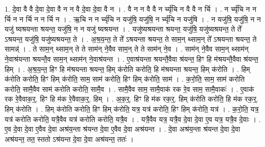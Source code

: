 \documentclass[17pt]{extarticle}
\begin{document}
1. दे॒वा वै वै दे॒वा दे॒वा वै न न वै दे॒वा दे॒वा वै न । . वै न न वै वै न र्च्यृ॑चि न वै वै न र्चि । . न र्च्यृ॑चि न न र्चि न न र्चि न न र्चि न । . ऋ॒चि न न र्च्यृ॑चि न यजु॑षि॒ यजु॑षि॒ न र्च्यृ॑चि न यजु॑षि । . न यजु॑षि॒ यजु॑षि॒ न न यजु॑ ष्यश्रयन्ता श्रयन्त॒ यजु॑षि॒ न न यजु॑ ष्यश्रयन्त । . यजु॑ष्यश्रयन्ता श्रयन्त॒ यजु॑षि॒ यजु॑ष्यश्रयन्त॒ ते ते᳚ ऽश्रयन्त॒ यजु॑षि॒ यजु॑ष्यश्रयन्त॒ ते । . अ॒श्र॒य॒न्त॒ ते ते᳚ ऽश्रयन्ता श्रयन्त॒ ते साम॒न् थ्साम॒न् ते᳚ ऽश्रयन्ता श्रयन्त॒ ते सामन्न्॑ । . ते साम॒न् थ्साम॒न् ते ते साम॑न् ने॒वैव साम॒न् ते ते साम॑न् ने॒व । . साम॑न् ने॒वैव साम॒न् थ्साम॑न् ने॒वाश्र॑यन्ता श्रयन्तै॒व साम॒न् थ्साम॑न् ने॒वाश्र॑यन्त । . ए॒वाश्र॑यन्ता श्रयन्तै॒वैवा श्र॑यन्त॒ हिꣳ हि म॑श्रयन्तै॒वैवा श्र॑यन्त॒ हिम् । . अ॒श्र॒य॒न्त॒ हिꣳ हि म॑श्रयन्ता श्रयन्त॒ हिम् क॑रोति करोति॒ हि म॑श्रयन्ता श्रयन्त॒ हिम् क॑रोति । . हिम् क॑रोति करोति॒ हिꣳ हिम् क॑रोति॒ साम॒ साम॑ करोति॒ हिꣳ हिम् क॑रोति॒ साम॑ । . क॒रो॒ति॒ साम॒ साम॑ करोति करोति॒ सामै॒वैव साम॑ करोति करोति॒ सामै॒व । . सामै॒वैव साम॒ सामै॒वाक॑ रक रे॒व साम॒ सामै॒वाकः॑ । . ए॒वाक॑ रक रे॒वैवाक॒र्॒. हिꣳ हि म॑क रे॒वैवाक॒र्॒. हिम् । . अ॒क॒र्॒. हिꣳ हि म॑क रक॒र्॒. हिम् क॑रोति करोति॒ हि म॑क रक॒र्॒. हिम् क॑रोति । . हिम् क॑रोति करोति॒ हिꣳ हिम् क॑रोति॒ यत्र॒ यत्र॑ करोति॒ हिꣳ हिम् क॑रोति॒ यत्र॑ । . क॒रो॒ति॒ यत्र॒ यत्र॑ करोति करोति॒ यत्रै॒वैव यत्र॑ करोति करोति॒ यत्रै॒व । . यत्रै॒वैव यत्र॒ यत्रै॒व दे॒वा दे॒वा ए॒व यत्र॒ यत्रै॒व दे॒वाः । . ए॒व दे॒वा दे॒वा ए॒वैव दे॒वा अश्र॑य॒न्ता श्र॑यन्त दे॒वा ए॒वैव दे॒वा अश्र॑यन्त । . दे॒वा अश्र॑य॒न्ता श्र॑यन्त दे॒वा दे॒वा अश्र॑यन्त॒ तत॒ स्ततो ऽश्र॑यन्त दे॒वा दे॒वा अश्र॑यन्त॒ ततः॑ । \newline
\end{document}

